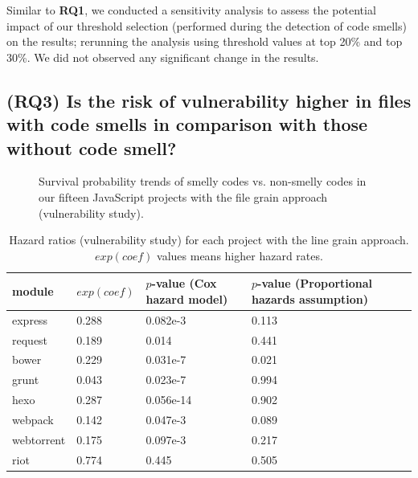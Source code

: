 Similar to \textbf{RQ1}, we conducted a sensitivity analysis to assess the potential impact of our threshold selection (performed during the detection of code smells) on the results; rerunning the analysis using threshold values at top 20\% and top 30\%. We did not observed any significant change in the results.

{\color{blue}
\subsection*{(RQ3) Is the risk of vulnerability higher in files with code smells in comparison with those without code smell?}

\begin{figure}[t]
	\centering%
	\caption{Survival probability trends of smelly codes vs. non-smelly codes in our fifteen JavaScript projects with the file grain approach (vulnerability study).\vspace{-10pt}}
	\label{rq3}
\end{figure}

\begin{table}[t]
	\centering
	\scriptsize
	\caption{Hazard ratios (vulnerability study) for each project with the line grain approach. $exp(coef)$ values means higher hazard rates.}
	\label{vulnlinegrain}
	\begin{tabular}{l|l|l|l}
		\hline
		module & $exp(coef)$ & $p$-value (Cox hazard model) & $p$-value (Proportional hazards assumption)     \\ \hline
		express  & 0.288 & 0.082e-3 & 0.113 \\ \hline
		request  & 0.189 & 0.014 & 0.441 \\ \hline
		bower	 & 0.229 & 0.031e-7 & 0.021 \\ \hline
		grunt    & 0.043 & 0.023e-7 & 0.994 \\ \hline
		hexo	 & 0.287 & 0.056e-14 & 0.902 \\ \hline
		webpack	 & 0.142 & 0.047e-3 & 0.089 \\ \hline
		webtorrent & 0.175 & 0.097e-3 & 0.217 \\ \hline
		riot	 & 0.774 & 0.445 & 0.505 \\ \hline
	\end{tabular}


\end{table}}

